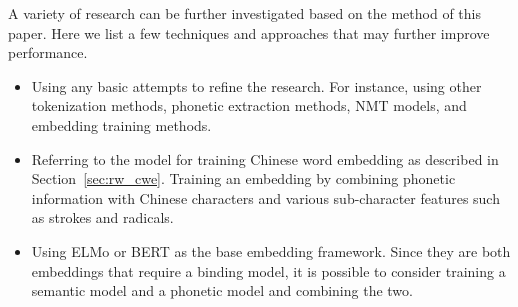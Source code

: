 A variety of research can be further investigated based on the method of this paper. Here we list a few techniques and approaches that may further improve performance.

\begin{itemize}
    \item Using any basic attempts to refine the research. For instance, using other tokenization methods, phonetic extraction methods, NMT models, and embedding training methods.
    \item Referring to the model for training Chinese word embedding as described in Section~\ref{sec:rw_cwe}. Training an embedding by combining phonetic information with Chinese characters and various sub-character features such as strokes and radicals.
    \item Using ELMo or BERT as the base embedding framework. Since they are both embeddings that require a binding model, it is possible to consider training a semantic model and a phonetic model and combining the two.
\end{itemize}
